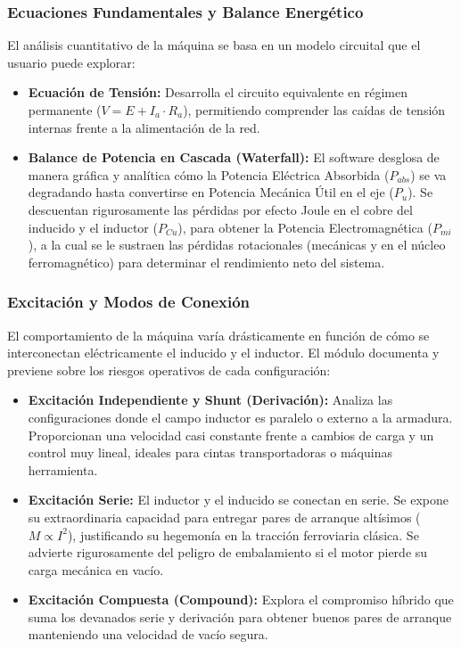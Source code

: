 \documentclass[11pt,a4paper]{article}
\begin{document}
\subsubsection{Ecuaciones Fundamentales y Balance Energético}
El análisis cuantitativo de la máquina se basa en un modelo circuital que el usuario puede explorar:
\begin{itemize}
    \item \textbf{Ecuación de Tensión:} Desarrolla el circuito equivalente en régimen permanente ($V = E + I_a \cdot R_a$), permitiendo comprender las caídas de tensión internas frente a la alimentación de la red.
    \item \textbf{Balance de Potencia en Cascada (Waterfall):} El software desglosa de manera gráfica y analítica cómo la Potencia Eléctrica Absorbida ($P_{abs}$) se va degradando hasta convertirse en Potencia Mecánica Útil en el eje ($P_u$). Se descuentan rigurosamente las pérdidas por efecto Joule en el cobre del inducido y el inductor ($P_{Cu}$), para obtener la Potencia Electromagnética ($P_{mi}$), a la cual se le sustraen las pérdidas rotacionales (mecánicas y en el núcleo ferromagnético) para determinar el rendimiento neto del sistema.
\end{itemize}

\subsubsection{Excitación y Modos de Conexión}
El comportamiento de la máquina varía drásticamente en función de cómo se interconectan eléctricamente el inducido y el inductor. El módulo documenta y previene sobre los riesgos operativos de cada configuración:
\begin{itemize}
    \item \textbf{Excitación Independiente y Shunt (Derivación):} Analiza las configuraciones donde el campo inductor es paralelo o externo a la armadura. Proporcionan una velocidad casi constante frente a cambios de carga y un control muy lineal, ideales para cintas transportadoras o máquinas herramienta.
    \item \textbf{Excitación Serie:} El inductor y el inducido se conectan en serie. Se expone su extraordinaria capacidad para entregar pares de arranque altísimos ($M \propto I^2$), justificando su hegemonía en la tracción ferroviaria clásica. Se advierte rigurosamente del peligro de embalamiento si el motor pierde su carga mecánica en vacío.
    \item \textbf{Excitación Compuesta (Compound):} Explora el compromiso híbrido que suma los devanados serie y derivación para obtener buenos pares de arranque manteniendo una velocidad de vacío segura.
\end{itemize}
\end{document}
